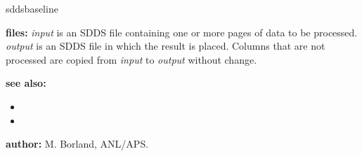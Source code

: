 \begin{sddsprog}{sddsbaseline}
\begin{itemize}
    \end{itemize}
  \item \textbf{files:}
    \emph{input} is an SDDS file containing one or more pages of data to be processed.
    \emph{output} is an SDDS file in which the result is placed. Columns that are not processed are copied from \emph{input} to \emph{output} without change.
  \item \textbf{see also:}
    \begin{itemize}
      \item {}
      \item {}
    \end{itemize}
  \item \textbf{author:} M. Borland, ANL/APS.
\end{sddsprog}
